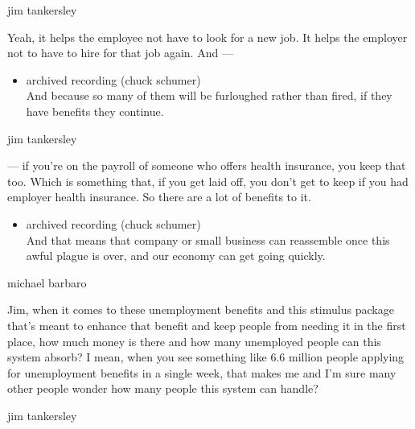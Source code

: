 jim tankersley

Yeah, it helps the employee not have to look for a new job. It helps the
employer not to have to hire for that job again. And ---

\begin{itemize}
\tightlist
\item
  archived recording (chuck schumer)\\
  And because so many of them will be furloughed rather than fired, if
  they have benefits they continue.
\end{itemize}

jim tankersley

--- if you're on the payroll of someone who offers health insurance, you
keep that too. Which is something that, if you get laid off, you don't
get to keep if you had employer health insurance. So there are a lot of
benefits to it.

\begin{itemize}
\tightlist
\item
  archived recording (chuck schumer)\\
  And that means that company or small business can reassemble once this
  awful plague is over, and our economy can get going quickly.
\end{itemize}

michael barbaro

Jim, when it comes to these unemployment benefits and this stimulus
package that's meant to enhance that benefit and keep people from
needing it in the first place, how much money is there and how many
unemployed people can this system absorb? I mean, when you see something
like 6.6 million people applying for unemployment benefits in a single
week, that makes me and I'm sure many other people wonder how many
people this system can handle?

jim tankersley

